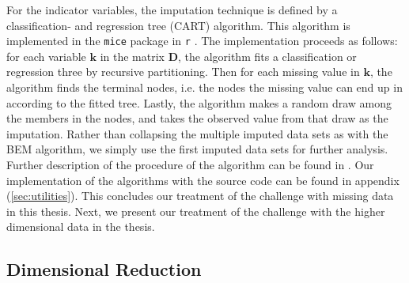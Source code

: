 \documentclass[../thesis.tex]{subfiles}
\begin{document}


\indent For the indicator variables, the imputation technique is defined by a classification- and regression tree (CART) algorithm. This algorithm is implemented in the \texttt{mice} package in \texttt{r} \citep{buuren2010mice}. The implementation proceeds as follows: for each variable $\boldsymbol{k}$ in the matrix $\boldsymbol{D}$, the algorithm fits a classification or regression three by recursive partitioning. Then for each missing value in $\boldsymbol{k}$, the algorithm finds the terminal nodes, i.e. the nodes the missing value can end up in according to the fitted tree. Lastly, the algorithm makes a random draw among the members in the nodes, and takes the observed value from that draw as the imputation. Rather than collapsing the multiple imputed data sets as with the BEM algorithm, we simply use the first imputed data sets for further analysis. Further description of the procedure of the algorithm can be found in \cite{burgette2010multiple}. Our implementation of the algorithms with the source code can be found in appendix (\ref{sec:utilities}). This concludes our treatment of the challenge with missing data in this thesis. Next, we present our treatment of the challenge with the higher dimensional data in the thesis.

\subsection{Dimensional Reduction}
\label{subsec:dim_red}
\end{document}
